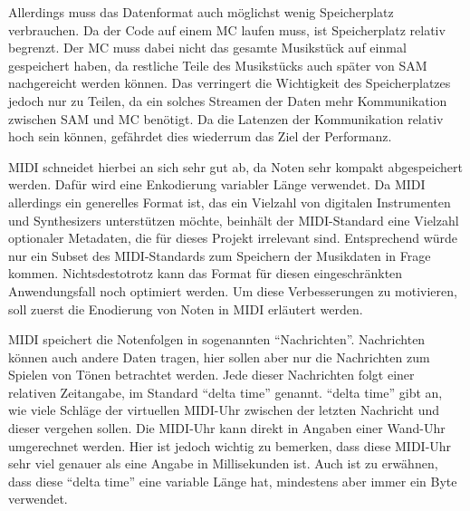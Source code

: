 Allerdings muss das Datenformat auch möglichst wenig Speicherplatz verbrauchen.
Da der Code auf einem \ac{MC} laufen muss, ist Speicherplatz relativ begrenzt.
Der \ac{MC} muss dabei nicht das gesamte Musikstück auf einmal gespeichert haben, da restliche Teile des Musikstücks auch später von \ac{SAM} nachgereicht werden können.
Das verringert die Wichtigkeit des Speicherplatzes jedoch nur zu Teilen, da ein solches Streamen der Daten mehr Kommunikation zwischen \ac{SAM} und {MC} benötigt.
Da die Latenzen der Kommunikation relativ hoch sein können, gefährdet dies wiederrum das Ziel der Performanz.

\ac{MIDI} schneidet hierbei an sich sehr gut ab, da Noten sehr kompakt abgespeichert werden.
Dafür wird eine Enkodierung variabler Länge verwendet.
Da \ac{MIDI} allerdings ein generelles Format ist, das ein Vielzahl von digitalen Instrumenten und Synthesizers unterstützen möchte, beinhält der \ac{MIDI}-Standard eine Vielzahl optionaler Metadaten, die für dieses Projekt irrelevant sind.
Entsprechend würde nur ein Subset des \ac{MIDI}-Standards zum Speichern der Musikdaten in Frage kommen.
Nichtsdestotrotz kann das Format für diesen eingeschränkten Anwendungsfall noch optimiert werden.
Um diese Verbesserungen zu motivieren, soll zuerst die Enodierung von Noten in \ac{MIDI} erläutert werden.

\ac{MIDI} speichert die Notenfolgen in sogenannten \enquote{Nachrichten}.
Nachrichten können auch andere Daten tragen, hier sollen aber nur die Nachrichten zum Spielen von Tönen betrachtet werden.
Jede dieser Nachrichten folgt einer relativen Zeitangabe, im Standard \enquote{delta time} genannt.
\enquote{delta time} gibt an, wie viele Schläge der virtuellen \ac{MIDI}-Uhr zwischen der letzten Nachricht und dieser vergehen sollen.
Die \ac{MIDI}-Uhr kann direkt in Angaben einer Wand-Uhr umgerechnet werden.
Hier ist jedoch wichtig zu bemerken, dass diese \ac{MIDI}-Uhr sehr viel genauer als eine Angabe in Millisekunden ist.
Auch ist zu erwähnen, dass diese \enquote{delta time} eine variable Länge hat, mindestens aber immer ein Byte verwendet.

